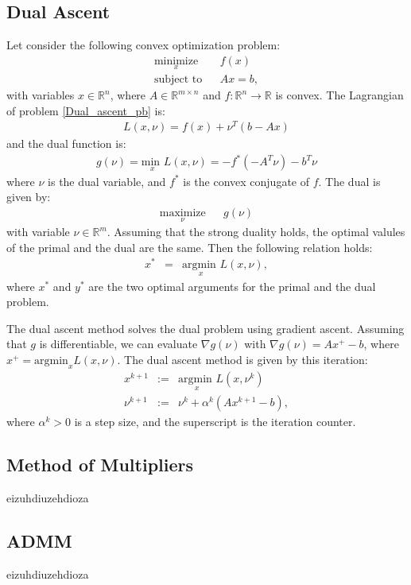 \documentclass{article}
\begin{document}
\subsection{Dual Ascent}
	\label{Dual Ascent}
	
	Let consider the following convex optimization problem:
\begin{eqnarray}
\label{Dual_ascent_pb}
\underset{x}{\text{minimize}} & & f(x) \\
\text{subject to} & & Ax = b, \nonumber
\end{eqnarray}
with variables $x \in \mathbb{R}^n$, where $A \in \mathbb{R}^{m \times n}$ and $ f : \mathbb{R}^n \to \mathbb{R}$ is convex. 
The Lagrangian of problem \ref{Dual_ascent_pb} is:
\begin{eqnarray*}
\label{Dual_ascent_Lag}
L(x,\nu) = f(x) + \nu^T (b - Ax)
\end{eqnarray*}
and the dual function is:
\begin{eqnarray*}
g(\nu) = \underset{x}{\text{min }} L(x, \nu) = - f^{*}(-A^T \nu) - b^T \nu
\end{eqnarray*}
where $\nu $ is the dual variable, and $f^*$ is the convex conjugate of $f$. The dual is given by:
\begin{eqnarray*}
\underset{\nu}{\text{maximize}} & & g(\nu)
\end{eqnarray*}
with variable $\nu \in \mathbb{R}^m$. Assuming that the strong duality holds, the optimal valules of the primal and the dual are the same. Then the following relation holds:
\begin{eqnarray*}
x^* &=& \underset{x}{\text{argmin }} L(x, \nu),
\end{eqnarray*}
where $x^*$ and $y^*$ are the two optimal arguments for the primal and the dual problem.

The dual ascent method solves the dual problem using gradient ascent. Assuming that $g$ is differentiable, we can evaluate $\nabla g(\nu)$ with $\nabla g(\nu) = Ax^+ - b$, where $x^+ = \text{argmin}_x L(x, \nu)$. The dual ascent method is given by this iteration:
\begin{eqnarray*}
x^{k+1} &:=& \underset{x}{\text{argmin }} L(x, \nu^k) \\
\nu^{k+1} &:=& \nu^k + \alpha^k (A x^{k+1} - b),
\end{eqnarray*}
where $\alpha^k > 0$ is a step size, and the superscript is the iteration counter.

\subsection{Method of Multipliers}
	\label{Method of Multipliers}
	
	eizuhdiuzehdioza

\subsection{ADMM}
	\label{ADMM}
	
	eizuhdiuzehdioza

 
 

\clearpage
\end{document}
